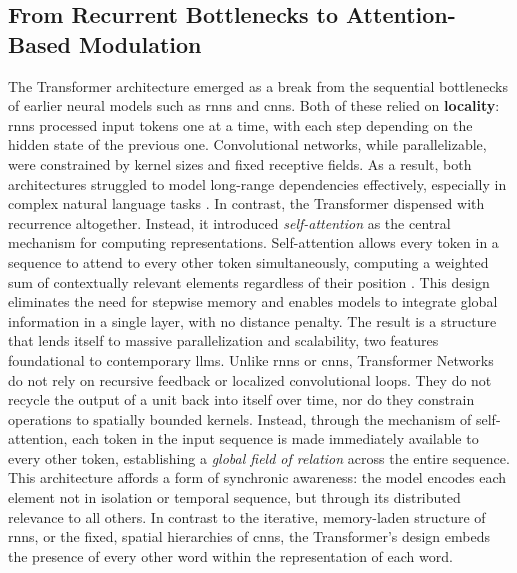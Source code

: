 \subsection{From Recurrent Bottlenecks to Attention-Based Modulation}
\label{subsec:transformer_modulation}





\yellowsquare
The Transformer architecture emerged as a break from the sequential bottlenecks of earlier neural models such as \glspl{rnn} and \glspl{cnn}. Both of these relied on \textbf{locality}: \glspl{rnn} processed input tokens one at a time, with each step depending on the hidden state of the previous one. Convolutional networks, while parallelizable, were constrained by \gls{kernel} sizes and fixed receptive fields. As a result, both architectures struggled to model long-range dependencies effectively, especially in complex natural language tasks \parencite[1-2]{vaswani2017a}. In contrast, the Transformer dispensed with recurrence altogether. Instead, it introduced \emph{self-attention} as the central mechanism for computing representations. Self-attention allows every token in a sequence to attend to every other token simultaneously, computing a weighted sum of contextually relevant elements regardless of their position \parencite[4]{vaswani2017a}. This design eliminates the need for stepwise memory and enables models to integrate global information in a single layer, with no distance penalty. The result is a structure that lends itself to massive parallelization and scalability, two features foundational to contemporary \glspl{llm}. Unlike \glspl{rnn} or \glspl{cnn}, Transformer Networks do not rely on recursive feedback or localized convolutional loops. They do not recycle the output of a unit back into itself over time, nor do they constrain operations to spatially bounded kernels. Instead, through the mechanism of self-attention, each \gls{token} in the input sequence is made immediately available to every other token, establishing a \emph{global field of relation} across the entire sequence. This architecture affords a form of synchronic awareness: the model encodes each element not in isolation or temporal sequence, but through its distributed relevance to all others. In contrast to the iterative, memory-laden structure of \glspl{rnn}, or the fixed, spatial hierarchies of \glspl{cnn}, the Transformer’s design embeds the presence of every other word within the representation of each word.

